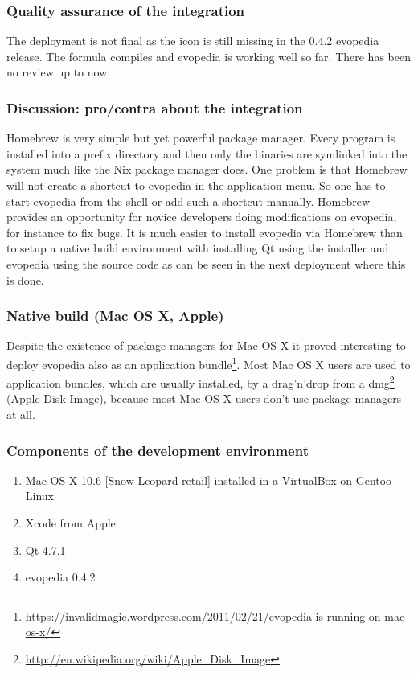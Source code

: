 \documentclass[a4paper,10pt]{article}
\begin{document}
\subsubsection*{Quality assurance of the integration}
The deployment is not final as the icon is still missing in the 0.4.2 evopedia release. The formula compiles and evopedia is working well so far. There has been no review up to now.

\subsubsection*{Discussion: pro/contra about the integration}
Homebrew is very simple but yet powerful package manager. Every program is installed into a prefix directory and then only the binaries are symlinked into the system much like the Nix package manager does. One problem is that Homebrew will not create a shortcut to evopedia in the application menu. So one has to start evopedia from the shell or add such a shortcut manually. Homebrew provides an opportunity for novice developers doing modifications on evopedia, for instance to fix bugs. It is much easier to install evopedia via Homebrew than to setup a native build environment with installing Qt using the installer and evopedia using the source code as can be seen in the next deployment where this is done.



\newpage
\subsubsection{Native build (Mac OS X, Apple)}
\label{nativemac}
Despite the existence of package managers for Mac OS X it proved interesting to deploy evopedia also as an application bundle\footnote{\url{https://invalidmagic.wordpress.com/2011/02/21/evopedia-is-running-on-mac-os-x/}}. Most Mac OS X users are used to application bundles, which are usually installed, by a drag'n'drop from a dmg\footnote{\url{http://en.wikipedia.org/wiki/Apple_Disk_Image}} (Apple Disk Image), because most Mac OS X users don't use package managers at all.

\subsubsection*{Components of the development environment}
\begin{enumerate}
 \item Mac OS X 10.6 [Snow Leopard retail] installed in a VirtualBox on Gentoo Linux
 \item Xcode from Apple
 \item Qt 4.7.1
 \item evopedia 0.4.2
\end{enumerate}
\end{document}
